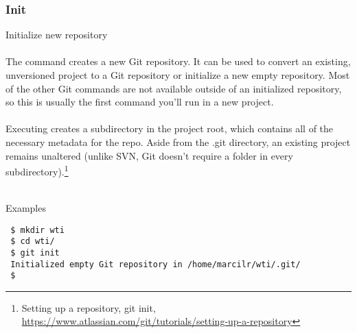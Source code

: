 
\subsubsection{Init}
Initialize new repository
\\
\\
The  command creates a new Git repository.  It can be
used to convert an existing, unversioned project to a Git
repository or initialize a new empty repository. Most of the other
Git commands are not available outside of an initialized
repository, so this is usually the first command you’ll run in a
new project.
\\
\\
Executing  creates a  subdirectory in the
project root, which contains all of the necessary metadata for the
repo. Aside from the .git directory, an existing project remains
unaltered (unlike SVN, Git doesn't require a  folder in
every subdirectory).\footnote{Setting up a repository, git init,\\
\href{https://www.atlassian.com/git/tutorials/setting-up-a-repository}
{https://www.atlassian.com/git/tutorials/setting-up-a-repository}}
\\
\\
\begin{bf}Examples\end{bf}

\begin{Verbatim}
 $ mkdir wti
 $ cd wti/
 $ git init
 Initialized empty Git repository in /home/marcilr/wti/.git/
 $ 
\end{Verbatim}

